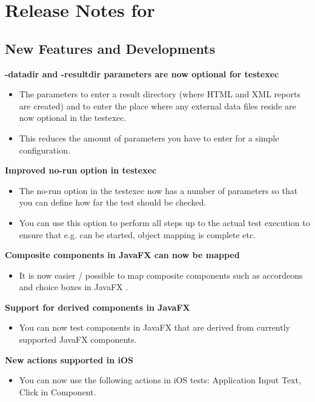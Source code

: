 \makeatletter
\section{Release Notes for \@bxversion}
\makeatother

\subsection{New Features and Developments}
\textbf{-datadir and -resultdir parameters are now optional for testexec}
\begin{itemize}
\item The parameters to enter a result directory (where HTML and XML reports are created) and to enter the place where any external data files reside are now optional in the testexec.
\item This reduces the amount of parameters you have to enter for a simple configuration.
\end{itemize}

\textbf{Improved no-run option in testexec}
\begin{itemize}
\item The no-run option in the testexec now has a number of parameters so that you can define how far the test should be checked. 
\item You can use this option to perform all steps up to the actual test execution to ensure that e.g. \gdauts{} can be started, object mapping is complete etc.
\end{itemize}

\textbf{Composite components in JavaFX can now be mapped}
\begin{itemize}
\item It is now easier / possible to map composite components such as accordeons and choice boxes in JavaFX \gdauts{}. 
\end{itemize}

\textbf{Support for derived components in JavaFX}
\begin{itemize}
\item You can now test components in JavaFX \gdauts{} that are derived from currently supported JavaFX components. 
\end{itemize}

\textbf{New actions supported in iOS}
\begin{itemize}
\item You can now use the following actions in iOS tests: Application Input Text, Click in Component.
\end{itemize}

